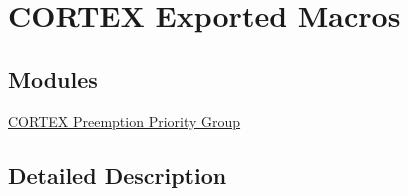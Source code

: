 \hypertarget{group___c_o_r_t_e_x___exported___macros}{\section{C\-O\-R\-T\-E\-X Exported Macros}
\label{group___c_o_r_t_e_x___exported___macros}
}
\subsection*{Modules}
\begin{DoxyCompactItemize}
\item 
\hyperlink{group___c_o_r_t_e_x___preemption___priority___group___macro}{C\-O\-R\-T\-E\-X Preemption Priority Group}
\end{DoxyCompactItemize}


\subsection{Detailed Description}
